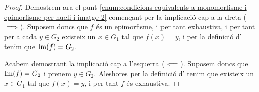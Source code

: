 \documentclass[../Apunts.tex]{subfiles}
\begin{document}
\begin{proposition}
\begin{proof}
			Demostrem ara el punt \eqref{enum:condicions equivalents a monomorfisme i epimorfisme per nucli i imatge 2} començant per la implicació cap a la dreta (\(\implies\)). Suposem doncs que \(f\) és un epimorfisme, i per tant exhaustiva, i per tant per a cada \(y\in G_{2}\) existeix un \(x\in G_{1}\) tal que \(f(x)=y\), i per la definició d' tenim que \(\operatorname{Im}(f)=G_{2}\).
			
			Acabem demostrant la implicació cap a l'esquerra (\(\impliedby\)). Suposem doncs que \(\operatorname{Im}(f)=G_{2}\) i prenem \(y\in G_{2}\). Aleshores per la definició d' tenim que existeix un \(x\in G_{1}\) tal que \(f(x)=y\), i per tant \(f\) és exhaustiva. %
		\end{proof}
	\end{proposition}
\end{document}
